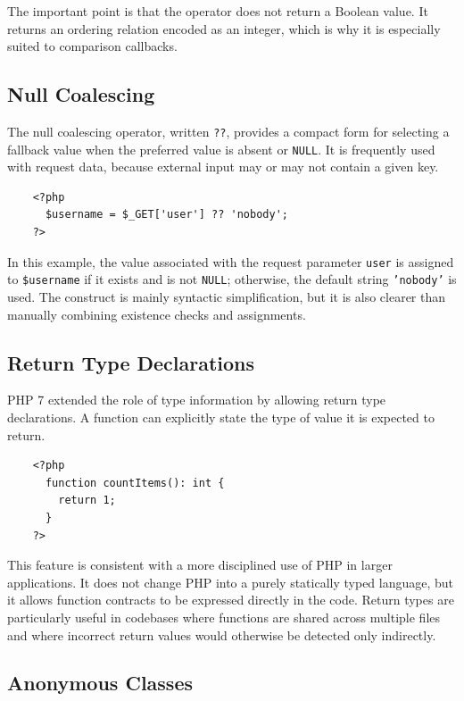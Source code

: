\documentclass{scrbook}
\begin{document}
	The important point is that the operator does not return a Boolean value. It returns an ordering relation encoded as an integer, which is why it is especially suited to comparison callbacks.
	
	\subsection{Null Coalescing}
	
	The null coalescing operator, written \texttt{??}, provides a compact form for selecting a fallback value when the preferred value is absent or \texttt{NULL}. It is frequently used with request data, because external input may or may not contain a given key.
	
	\begin{lstlisting}
	<?php
	  $username = $_GET['user'] ?? 'nobody';
	?>
	\end{lstlisting}
	
	In this example, the value associated with the request parameter \texttt{user} is assigned to \texttt{\$username} if it exists and is not \texttt{NULL}; otherwise, the default string \texttt{'nobody'} is used. The construct is mainly syntactic simplification, but it is also clearer than manually combining existence checks and assignments.
	
	\subsection{Return Type Declarations}
	
	PHP 7 extended the role of type information by allowing return type declarations. A function can explicitly state the type of value it is expected to return.
	
	\begin{lstlisting}
	<?php
	  function countItems(): int {
		return 1;
	  }
	?>
	\end{lstlisting}
	
	This feature is consistent with a more disciplined use of PHP in larger applications. It does not change PHP into a purely statically typed language, but it allows function contracts to be expressed directly in the code. Return types are particularly useful in codebases where functions are shared across multiple files and where incorrect return values would otherwise be detected only indirectly.
	
	\subsection{Anonymous Classes}
	
\end{document}
